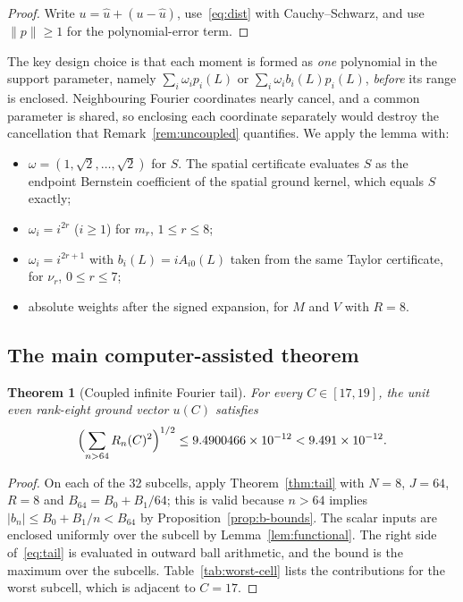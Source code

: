 \documentclass[11pt,a4paper]{article}
\newtheorem{theorem}{Theorem}[section]
\theoremstyle{definition}
\newcommand{\norm}[1]{\lVert #1\rVert}
\newcommand{\abs}[1]{\lvert #1\rvert}
\begin{document}
\begin{proof}
Write $u=\hat u+(u-\hat u)$, use~\eqref{eq:dist} with Cauchy--Schwarz, and
use $\norm p\ge1$ for the polynomial-error term.
\end{proof}

The key design choice is that each moment is formed as \emph{one}
polynomial in the support parameter, namely $\sum_i\omega_ip_i(L)$ or
$\sum_i\omega_ib_i(L)p_i(L)$, \emph{before} its range is enclosed. Neighbouring
Fourier coordinates nearly cancel, and a common parameter is shared, so
enclosing each coordinate separately would destroy the cancellation that
Remark~\ref{rem:uncoupled} quantifies. We apply the lemma with:
\begin{itemize}
\item $\omega=(1,\sqrt2,\dots,\sqrt2)$ for $S$. The spatial certificate
evaluates $S$ as the endpoint Bernstein coefficient of the spatial ground
kernel, which equals $S$ exactly;
\item $\omega_i=i^{2r}$ ($i\ge1$) for $m_r$, $1\le r\le8$;
\item $\omega_i=i^{2r+1}$ with $b_i(L)=iA_{i0}(L)$ taken from the same
Taylor certificate, for $\nu_r$, $0\le r\le7$;
\item absolute weights after the signed expansion, for $M$ and $V$ with $R=8$.
\end{itemize}

\subsection{The main computer-assisted theorem}

\begin{theorem}[Coupled infinite Fourier tail]\label{thm:main-tail}
For every $C\in[17,19]$, the unit even rank-eight ground vector $u(C)$
satisfies
\[
\Bigl(\sum_{n>64}R_n(C)^2\Bigr)^{1/2}\le 9.4900466\times10^{-12}<9.491\times10^{-12}.
\]
\end{theorem}

\begin{proof}
On each of the 32 subcells, apply Theorem~\ref{thm:tail} with $N=8$, $J=64$,
$R=8$ and $B_{64}=B_0+B_1/64$; this is valid because $n>64$ implies
$\abs{b_n}\le B_0+B_1/n<B_{64}$ by Proposition~\ref{prop:b-bounds}. The scalar
inputs are enclosed uniformly over the subcell by Lemma~\ref{lem:functional}.
The right side of~\eqref{eq:tail} is evaluated in outward ball arithmetic,
and the bound is the maximum over the subcells. Table~\ref{tab:worst-cell}
lists the contributions for the worst subcell, which is adjacent to $C=17$.
\end{proof}
\end{document}
